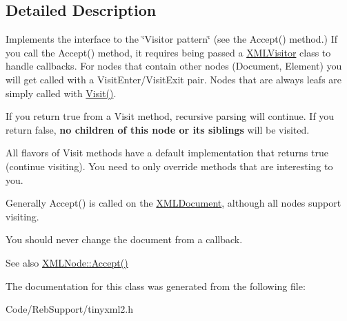 \subsection{Detailed Description}
Implements the interface to the \char`\"{}\+Visitor pattern\char`\"{} (see the Accept() method.) If you call the Accept() method, it requires being passed a \hyperlink{classtinyxml2_1_1_x_m_l_visitor}{X\+M\+L\+Visitor} class to handle callbacks. For nodes that contain other nodes (Document, Element) you will get called with a Visit\+Enter/\+Visit\+Exit pair. Nodes that are always leafs are simply called with \hyperlink{classtinyxml2_1_1_x_m_l_visitor_adc75bd459fc7ba8223b50f0616767f9a}{Visit()}.

If you return \textquotesingle{}true\textquotesingle{} from a Visit method, recursive parsing will continue. If you return false, {\bfseries no children of this node or its siblings} will be visited.

All flavors of Visit methods have a default implementation that returns \textquotesingle{}true\textquotesingle{} (continue visiting). You need to only override methods that are interesting to you.

Generally Accept() is called on the \hyperlink{classtinyxml2_1_1_x_m_l_document}{X\+M\+L\+Document}, although all nodes support visiting.

You should never change the document from a callback.

\begin{DoxySeeAlso}{See also}
\hyperlink{classtinyxml2_1_1_x_m_l_node_a366ad0e9b9ae8d1b18c00f903994b7a9}{X\+M\+L\+Node\+::\+Accept()} 
\end{DoxySeeAlso}


The documentation for this class was generated from the following file\+:\begin{DoxyCompactItemize}
\item 
Code/\+Reb\+Support/tinyxml2.\+h\end{DoxyCompactItemize}
